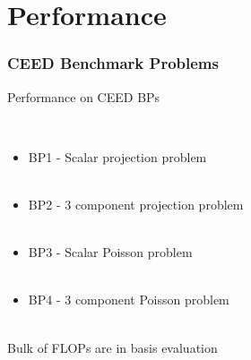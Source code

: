 \documentclass{beamer}
\begin{document}
\section{Performance}

\begin{frame}
\begin{center}
\frametitle{CEED Benchmark Problems}

Performance on CEED BPs

~\\

\begin{itemize}

\item BP1 - Scalar projection problem\\

~\\

\item BP2 - 3 component projection problem\\

~\\

\item BP3 - Scalar Poisson problem\\

~\\

\item BP4 - 3 component Poisson problem\\

\end{itemize}

~\\

Bulk of FLOPs are in basis evaluation

\end{center}
\end{frame}

\end{document}
